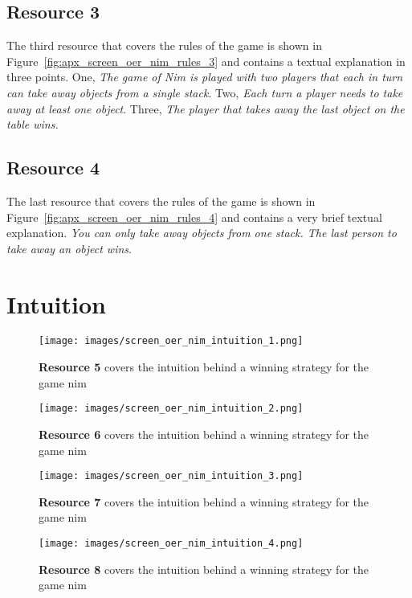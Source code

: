 \subsection{Resource 3}
The third resource that covers the rules of the game is shown in
Figure~\ref{fig:apx_screen_oer_nim_rules_3} and contains a
textual explanation in three points. One, \emph{The game of Nim is played
with two players that each in turn can take away objects from a single stack}.
Two, \emph{Each turn a player needs to take away at least one object}.
Three, \emph{The player that takes away the last object on the table wins.}
\subsection{Resource 4}
The last resource that covers the rules of the game is shown in
Figure~\ref{fig:apx_screen_oer_nim_rules_4} and contains a
very brief textual explanation. \emph{You can only take away objects from one
stack. The last person to take away an object wins}.
\section{Intuition}
\begin{figure}[ht]
    \centering
    \texttt{[image: images/screen\_oer\_nim\_intuition\_1.png]}
	\caption[Resource 5]{\textbf{Resource 5} covers the intuition
    behind a winning strategy for the game nim}
    \label{fig:apx_screen_oer_nim_intuition_1}
\end{figure}
\begin{figure}[ht]
    \centering
    \texttt{[image: images/screen\_oer\_nim\_intuition\_2.png]}
	\caption[Resource 6]{\textbf{Resource 6} covers the intuition
    behind a winning strategy for the game nim}
    \label{fig:apx_screen_oer_nim_intuition_2}
\end{figure}
\begin{figure}[ht]
    \centering
    \texttt{[image: images/screen\_oer\_nim\_intuition\_3.png]}
	\caption[Resource 7]{\textbf{Resource 7} covers the intuition
    behind a winning strategy for the game nim}
    \label{fig:apx_screen_oer_nim_intuition_3}
\end{figure}
\begin{figure}[ht]
    \centering
    \texttt{[image: images/screen\_oer\_nim\_intuition\_4.png]}
	\caption[Resource 8]{\textbf{Resource 8} covers the intuition
    behind a winning strategy for the game nim}
    \label{fig:apx_screen_oer_nim_intuition_4}
\end{figure}
